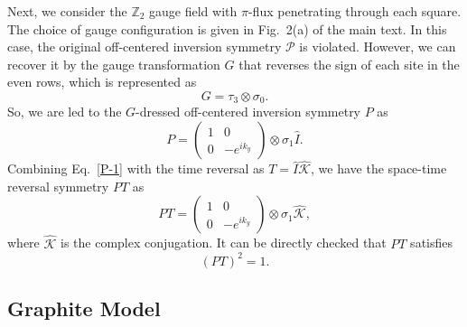 \documentclass[aps,prl,twocolumn,noshowpacs,superscriptaddress]{revtex4-1}
\def \Z {\mathbb{Z}}
\begin{document}
Next, we consider the $ \Z_2 $ gauge field with $ \pi $-flux penetrating through each square. The choice of gauge configuration is given in Fig.~2(a) of the main text. In this case, the original off-centered inversion symmetry $ \mathcal{P} $ is violated. However, we can recover it by the gauge transformation $ G $ that reverses the sign of each site in the even rows, which is represented as
\begin{equation}\label{gauge-1}
	G=\tau_3\otimes\sigma_0.
\end{equation}
So, we are led to the $ G $-dressed off-centered inversion symmetry $ P $ as
\begin{equation}\label{P-1}
	P=\begin{pmatrix}
		1 & 0 \\ 0 & -e^{ik_y}
	\end{pmatrix}\otimes\sigma_1\hat{I}.
\end{equation}
Combining Eq.~\eqref{P-1} with the time reversal as $ T=\hat{I}\hat{\mathcal{K}} $, we have the space-time reversal symmetry $ PT $ as
\begin{equation}\label{PT-1}
	PT=\begin{pmatrix}
		1 & 0 \\ 0 & -e^{ik_y}
	\end{pmatrix}\otimes\sigma_1\hat{\mathcal{K}},
\end{equation}
where $ \hat{\mathcal{K}} $ is the complex conjugation. It can be directly checked that $ PT $ satisfies
\begin{equation}
	(PT)^2=1.
\end{equation}



\subsection{Graphite Model}
\end{document}
